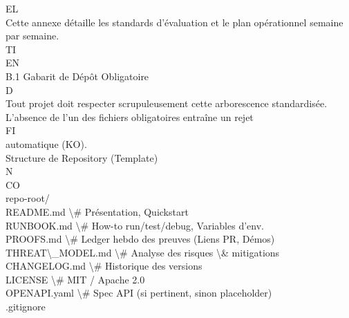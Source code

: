 \documentclass[12pt,landscape,a4paper]{article}
\begin{document}
\vspace{0.5em}
\vspace{0.5em}
EL\\
Cette annexe détaille les standards d’évaluation et le plan opérationnel semaine par semaine.\\
\vspace{0.5em}
\vspace{0.5em}
\vspace{0.5em}
\vspace{0.5em}
TI\\
EN\\
B.1 Gabarit de Dépôt Obligatoire\\
\vspace{0.5em}
\vspace{0.5em}
\vspace{0.5em}
\vspace{0.5em}
D\\
Tout projet doit respecter scrupuleusement cette arborescence standardisée. L’absence de l’un des fichiers obligatoires entraîne un rejet\\
\vspace{0.5em}
\vspace{0.5em}
\vspace{0.5em}
\vspace{0.5em}
FI\\
automatique (KO).\\
\vspace{0.5em}
Structure de Repository (Template)\\
N\\
CO\\
repo-root/\\
README.md                  \textbackslash{}# Présentation, Quickstart\\
RUNBOOK.md                 \textbackslash{}# How-to run/test/debug, Variables d'env.\\
PROOFS.md                  \textbackslash{}# Ledger hebdo des preuves (Liens PR, Démos)\\
THREAT\textbackslash{}_MODEL.md            \textbackslash{}# Analyse des risques \textbackslash{}& mitigations\\
CHANGELOG.md               \textbackslash{}# Historique des versions\\
LICENSE                    \textbackslash{}# MIT / Apache 2.0\\
OPENAPI.yaml               \textbackslash{}# Spec API (si pertinent, sinon placeholder)\\
.gitignore\\
\end{document}
